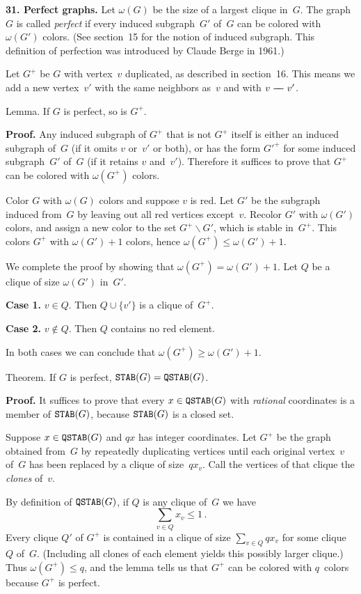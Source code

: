 \meno
{\bf 31. Perfect graphs.}\quad
Let $\omega(G)$ be the size of a largest clique in~$G$. The graph~$G$
is called {\it perfect\/} if every induced subgraph~$G'$ of~$G$ can be
colored with $\omega(G')$ colors. (See section~15 for the notion of
induced subgraph. This definition of perfection was introduced by
Claude Berge in 1961.)

Let $G^+$ be $G$ with vertex~$v$ duplicated, as described in
section~16. This means we add
a new vertex~$v'$ with the same neighbors as~$v$ and with $v\adj v'$.

\proclaim
Lemma. If $G$ is perfect, so is $G^+$.

\noindent
{\bf Proof.}\quad
Any induced subgraph of $G^+$ that is not $G^+$ itself is either an induced
subgraph of~$G$ (if it omits $v$ or~$v'$ or both), or has the form $G'^+$ for
some induced subgraph~$G'$ of~$G$ (if it retains $v$ and~$v'$). Therefore it
suffices to prove that $G^+$ can be colored with $\omega(G^+)$ colors.

Color $G$ with $\omega(G)$ colors and suppose $v$ is red. Let $G'$ be the
subgraph induced from~$G$ by leaving out all red vertices except~$v$. Recolor
$G'$ with $\omega(G')$ colors, and assign a new color to the set
$G^+\backslash G'$, which is stable in~$G^+$. This colors $G^+$ with
$\omega(G')+1$ colors, hence $\omega(G^+)\leq\omega(G')+1$.

We complete the proof by showing that $\omega(G^+)=\omega(G')+1$. Let $Q$ be a
clique of size $\omega(G')$ in~$G'$.


{\bf Case 1.} $v\in Q$. Then $Q\cup\{v'\}$ is a clique
of~$G^+$.  

{\bf Case 2.} $v\notin Q$. Then $Q$ contains no red element.

\noindent
In both cases we can conclude that $\omega(G^+)\geq \omega(G')+1$. \ \pfbox

\proclaim
Theorem. If $G$ is perfect, ${\tt STAB}(G)={\tt QSTAB}(G)$.

\noindent
{\bf Proof.}\quad
It suffices to prove that every $x\in{\tt QSTAB}(G)$ with {\it
rational\/} coordinates is a member of ${\tt STAB}(G)$, because ${\tt
STAB}(G)$ is a closed set.

Suppose $x\in{\tt QSTAB}(G)$ and $qx$ has integer coordinates. Let
$G^+$ be the graph obtained from~$G$ by repeatedly duplicating
vertices until each original vertex~$v$ of~$G$ has been replaced by a
clique of size~$qx_v$. Call the vertices of that clique the {\it
clones\/} of~$v$. 

By definition of ${\tt QSTAB}(G)$, if $Q$ is any clique of~$G$ we have
$$\sum_{v\in Q}x_v\leq 1\,.$$
Every clique $Q'$ of $G^+$ is contained in a clique of size
$\sum_{v\in Q}qx_v$ for some clique~$Q$ of~$G$. (Including all clones
of each element yields this possibly larger clique.) Thus
$\omega(G^+)\leq q$, and the lemma tells us that $G^+$ can be colored
with $q$~colors because $G^+$ is perfect.


